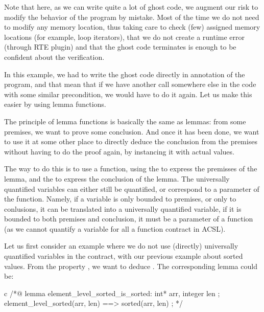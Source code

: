 Note that here, as we can write quite a lot of ghost code, we augment our risk
to modify the behavior of the program by mistake. Most of the time we do not
need to modify any memory location, thus taking care to check (few) assigned
memory locations (for example, loop iterators), that we do not create a runtime
error (through RTE plugin) and that the ghost code terminates is enough to be
confident about the verification.



In this example, we had to write the ghost code directly in annotation of the
program, and that mean that if we have another call somewhere else in the code
with some similar precondition, we would have to do it again. Let us make this
easier by using lemma functions.






The principle of lemma functions is basically the same as lemmas: from some
premises, we want to prove some conclusion. And once it has been done, we want
to use it at some other place to directly deduce the conclusion from the
premises without having to do the proof again, by instancing it with actual
values.



The way to do this is to use a function, using the  to
express the premisses of the lemma, and the  to express the
conclusion of the lemma. The universally quantified variables can either still
be quantified, or correspond to a parameter of the function. Namely, if a
variable is only bounded to premises, or only to conlusions, it can be
translated into a universally quantified variable, if it is bounded to both
premises and conclusion, it must be a parameter of a function (as we cannot
quantify a variable for all a function contract in ACSL).



Let us first consider an example where we do not use (directly) universally
quantified variables in the contract, with our previous example about sorted
values. From the property , we
want to deduce . The corresponding lemma could be:


\begin{CodeBlock}{c}
/*@
  lemma element_level_sorted_is_sorted:
    \forall int* arr, integer len ;
       element_level_sorted(arr, len) ==> sorted(arr, len) ;
*/
\end{CodeBlock}


